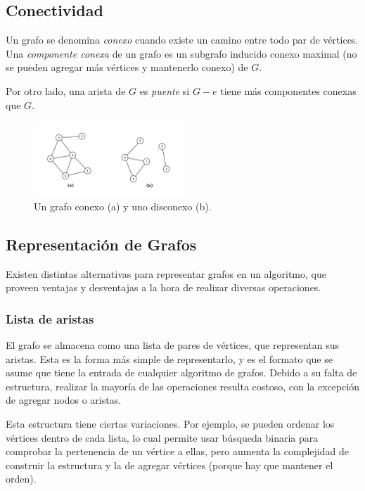 \documentclass[a4paper]{report}
\begin{document}
\subsection{Conectividad}

Un grafo se denomina \textit{conexo} cuando existe un camino entre todo par de vértices. Una \textit{componente conexa} de un grafo es un subgrafo inducido conexo maximal (no se pueden agregar más vértices y mantenerlo conexo) de $G$.

Por otro lado, una arista de $G$ es \textit{puente} si $G - e$ tiene más componentes conexas que $G$.

\begin{figure}[H]
    \centering
    \includegraphics[width=0.5\textwidth]{ejemplo_conexo.png}
    \caption*{Un grafo conexo (a) y uno disconexo (b).}
\end{figure}

\subsection{Representación de Grafos}
\label{representacion-grafos}

Existen distintas alternativas para representar grafos en un algoritmo, que proveen ventajas y desventajas a la hora de realizar diversas operaciones.

\subsubsection{Lista de aristas}

El grafo se almacena como una lista de pares de vértices, que representan sus aristas. Esta es la forma más simple de representarlo, y es el formato que se asume que tiene la entrada de cualquier algoritmo de grafos. Debido a su falta de estructura, realizar la mayoría de las operaciones resulta costoso, con la excepción de agregar nodos o aristas.

Esta estructura tiene ciertas variaciones. Por ejemplo, se pueden ordenar los vértices dentro de cada lista, lo cual permite usar búsqueda binaria para comprobar la pertenencia de un vértice a ellas, pero aumenta la complejidad de construir la estructura y la de agregar vértices (porque hay que mantener el orden).
\end{document}
